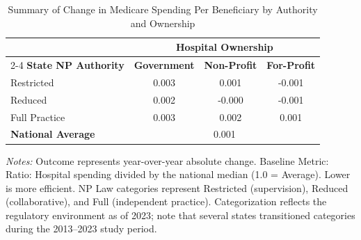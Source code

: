 \begin{table}[htbp]
    \centering
    \caption{Summary of Change in Medicare Spending Per Beneficiary by Authority and Ownership}
    \label{tab:d_mspb_score}
    \vspace{0.2cm}
    \begin{tabular}{lccc}
        \toprule
        & \multicolumn{3}{c}{\textbf{Hospital Ownership}} \\
        \cmidrule(lr){2-4}
        \textbf{State NP Authority} & \textbf{Government} & \textbf{Non-Profit} & \textbf{For-Profit} \\
        \midrule
        Restricted & 0.003 & 0.001 & -0.001 \\
        Reduced & 0.002 & -0.000 & -0.001 \\
        Full Practice & 0.003 & 0.002 & 0.001 \\
        \midrule
        \textbf{National Average} & \multicolumn{3}{c}{0.001} \\
        \bottomrule
    \end{tabular}
    \vspace{0.1cm}
    \begin{minipage}{0.85\textwidth}
        \footnotesize \textit{Notes:} Outcome represents year-over-year absolute change. Baseline Metric: Ratio: Hospital spending divided by the national median (1.0 = Average). Lower is more efficient. NP Law categories represent Restricted (supervision), Reduced (collaborative), and Full (independent practice). Categorization reflects the regulatory environment as of 2023; note that several states transitioned categories during the 2013--2023 study period.
    \end{minipage}
\end{table}